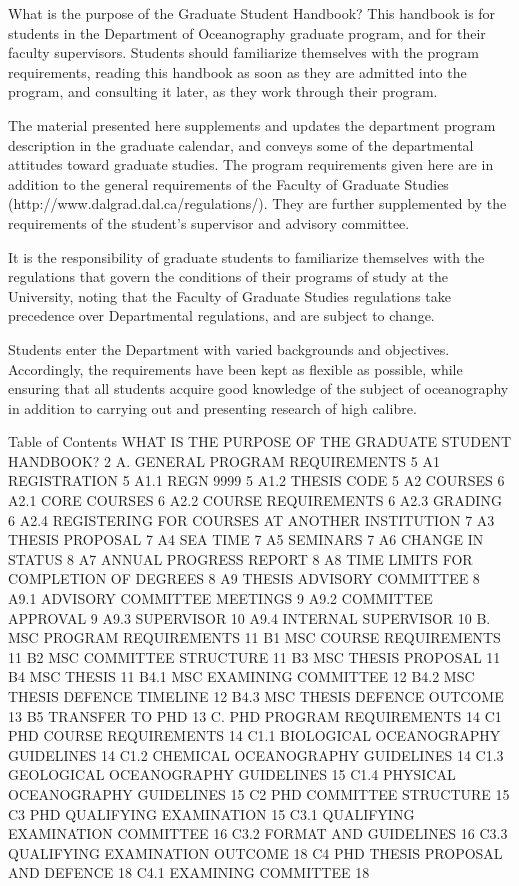 
 
















What is the purpose of the Graduate Student   Handbook?
This handbook is for students in the Department of Oceanography graduate program, and for their faculty supervisors. Students should familiarize themselves with the program requirements, reading this handbook as soon as they are admitted into the program, and consulting it later, as they work through their program.

The material presented here supplements and updates the department program description in the  graduate calendar, and conveys some of the departmental attitudes toward graduate studies.  The program requirements given here are in addition to the general requirements of the Faculty of Graduate Studies (http://www.dalgrad.dal.ca/regulations/). They are further supplemented by the requirements of the student's supervisor and advisory committee.

It is the responsibility of graduate students to familiarize themselves with the regulations that govern the conditions of their programs of study at the University, noting that the Faculty of Graduate Studies regulations take precedence over Departmental regulations, and are subject to change.

Students enter the Department with varied backgrounds and objectives. Accordingly, the requirements have been kept as flexible as possible, while ensuring that all students acquire good knowledge of the subject of oceanography in addition to carrying out and presenting research of high calibre.
 

Table of Contents
WHAT IS THE PURPOSE OF THE GRADUATE STUDENT HANDBOOK?	2
A.	GENERAL PROGRAM REQUIREMENTS	5
A1	REGISTRATION	5
A1.1	REGN 9999	5
A1.2	THESIS CODE	5
A2	COURSES	6
A2.1	CORE COURSES	6
A2.2	COURSE REQUIREMENTS	6
A2.3	GRADING	6
A2.4	REGISTERING FOR COURSES AT ANOTHER INSTITUTION	7
A3	THESIS PROPOSAL	7
A4	SEA TIME	7
A5	SEMINARS	7
A6	CHANGE IN STATUS	8
A7	ANNUAL PROGRESS REPORT	8
A8	TIME LIMITS FOR COMPLETION OF DEGREES	8
A9	THESIS ADVISORY COMMITTEE	8
A9.1	ADVISORY COMMITTEE MEETINGS	9
A9.2	COMMITTEE APPROVAL	9
A9.3	SUPERVISOR	10
A9.4	INTERNAL SUPERVISOR	10
B.	MSC PROGRAM REQUIREMENTS	11
B1	MSC COURSE REQUIREMENTS	11
B2	MSC COMMITTEE STRUCTURE	11
B3	MSC THESIS PROPOSAL	11
B4	MSC THESIS	11
B4.1	MSC EXAMINING COMMITTEE	12
B4.2	MSC THESIS DEFENCE TIMELINE	12
B4.3	MSC THESIS DEFENCE OUTCOME	13
B5	TRANSFER TO PHD	13
C.	PHD PROGRAM REQUIREMENTS	14
C1	PHD COURSE REQUIREMENTS	14
C1.1	BIOLOGICAL OCEANOGRAPHY GUIDELINES	14
C1.2	CHEMICAL OCEANOGRAPHY GUIDELINES	14
C1.3	GEOLOGICAL OCEANOGRAPHY GUIDELINES	15
C1.4	PHYSICAL OCEANOGRAPHY GUIDELINES	15
C2	PHD COMMITTEE STRUCTURE	15
C3	PHD QUALIFYING EXAMINATION	15
C3.1	QUALIFYING EXAMINATION COMMITTEE	16
C3.2	FORMAT AND GUIDELINES	16
C3.3	QUALIFYING EXAMINATION OUTCOME	18
C4	PHD THESIS PROPOSAL AND DEFENCE	18
C4.1	EXAMINING COMMITTEE	18
 

